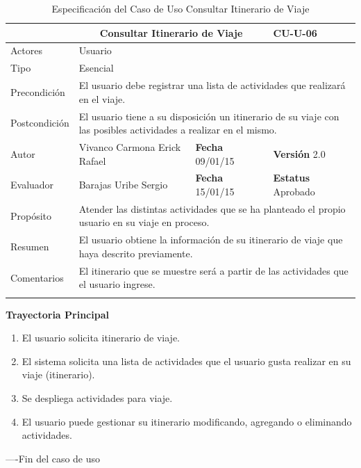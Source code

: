 \begin{longtable}{|p{2.5cm}|p{6.4cm}|p{2cm}|p{2cm}|}
	\hline
		\rowcolor[RGB]{51,153,255}{Caso de Uso}&\multicolumn{2}{c}{Consultar Itinerario de Viaje}&{\textbf{CU-U-06}}\\
	\hline
		{Actores}&\multicolumn{3}{p{11.2cm}|}{Usuario}\\
	\hline
		{Tipo}&\multicolumn{3}{p{11.2cm}|}{Esencial}\\
	\hline
		{Precondición}&\multicolumn{3}{p{11.2cm}|}{El usuario debe registrar una lista de actividades que realizará en el viaje.}\\
	\hline
		{Postcondición}&\multicolumn{3}{p{11.2cm}|}{El usuario tiene a su disposición un itinerario de su viaje con las posibles 
		actividades a realizar en el mismo.}\\
	\hline
		{Autor}&{Vivanco Carmona Erick Rafael}&{\textbf{Fecha} 09/01/15}&{\textbf{Versión} 2.0}\\
			\hline
		{Evaluador}&{Barajas Uribe Sergio}&{\textbf{Fecha} 15/01/15}&{\textbf{Estatus} Aprobado}\\
	\hline
		{Propósito}&\multicolumn{3}{p{11.2cm}|}{Atender las distintas actividades que se ha planteado el propio usuario en su viaje en proceso.}\\
	\hline
		{Resumen}&\multicolumn{3}{p{11.2cm}|}{El usuario obtiene la información de su itinerario de viaje que haya descrito previamente.}\\	
	\hline
		{Comentarios}&\multicolumn{3}{p{11.2cm}|}{El itinerario que se muestre será a partir de las actividades que el usuario ingrese.}\\	
	\hline
	\caption[Especificación del Caso de Uso Consultar Itinerario de Viaje]{Especificación del Caso de Uso Consultar Itinerario de Viaje}
    	\label{tab:cuConsultarItinerarioViaje}
\end{longtable}
\newpage
\begin{flushleft}
	\textbf{Trayectoria Principal}\\
	\begin{enumerate}
		\item El usuario solicita itinerario de viaje.
		\item El sistema solicita una lista de actividades que el usuario gusta realizar en su viaje (itinerario).
		\item Se despliega actividades para viaje.
		\item El usuario puede gestionar su itinerario modificando, agregando o eliminando actividades.
	\end{enumerate}
\end{flushleft}
----Fin del caso de uso

